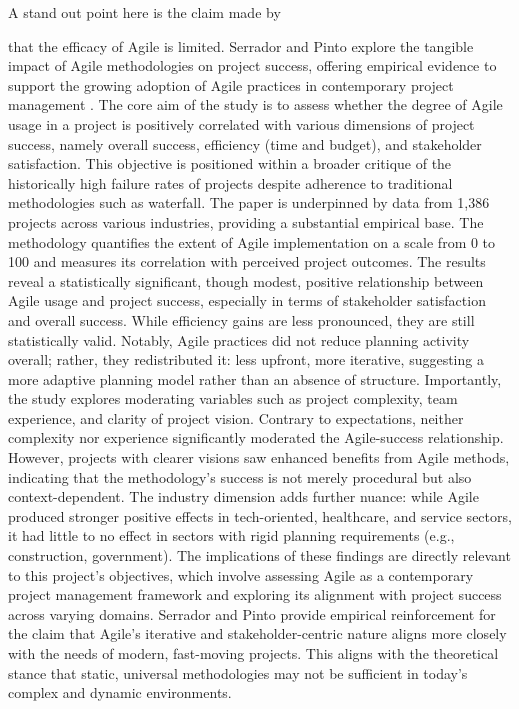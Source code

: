 \documentclass{report}
\begin{document}
A stand out point here is the claim made by \author{xueAnalysisComparisonProject} that the efficacy of Agile is limited. Serrador and Pinto explore the tangible impact of Agile methodologies on project success, offering empirical evidence to support the growing adoption of Agile practices in contemporary project management \parencite{serradorDoesAgileWork2015}. The core aim of the study is to assess whether the degree of Agile usage in a project is positively correlated with various dimensions of project success, namely overall success, efficiency (time and budget), and stakeholder satisfaction. This objective is positioned within a broader critique of the historically high failure rates of projects despite adherence to traditional methodologies such as waterfall.
The paper is underpinned by data from 1,386 projects across various industries, providing a substantial empirical base. The methodology quantifies the extent of Agile implementation on a scale from 0 to 100 and measures its correlation with perceived project outcomes. The results reveal a statistically significant, though modest, positive relationship between Agile usage and project success, especially in terms of stakeholder satisfaction and overall success. While efficiency gains are less pronounced, they are still statistically valid. Notably, Agile practices did not reduce planning activity overall; rather, they redistributed it: less upfront, more iterative, suggesting a more adaptive planning model rather than an absence of structure.
Importantly, the study explores moderating variables such as project complexity, team experience, and clarity of project vision. Contrary to expectations, neither complexity nor experience significantly moderated the Agile-success relationship. However, projects with clearer visions saw enhanced benefits from Agile methods, indicating that the methodology’s success is not merely procedural but also context-dependent. The industry dimension adds further nuance: while Agile produced stronger positive effects in tech-oriented, healthcare, and service sectors, it had little to no effect in sectors with rigid planning requirements (e.g., construction, government).
The implications of these findings are directly relevant to this project’s objectives, which involve assessing Agile as a contemporary project management framework and exploring its alignment with project success across varying domains. Serrador and Pinto provide empirical reinforcement for the claim that Agile’s iterative and stakeholder-centric nature aligns more closely with the needs of modern, fast-moving projects. This aligns with the theoretical stance that static, universal methodologies may not be sufficient in today’s complex and dynamic environments.
\end{document}
